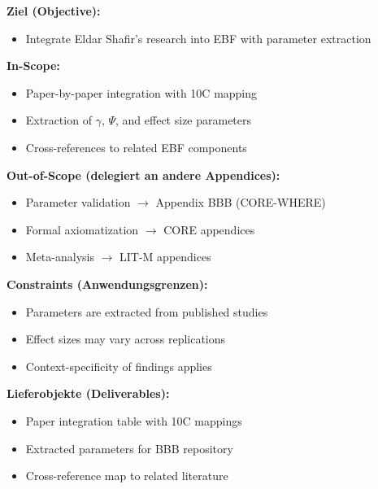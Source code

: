 
\begin{tcolorbox}[
    colback=orange!5!white,
    colframe=orange!75!black,
    title={\textbf{Appendix Scope: Ziel / In-Scope / Out-of-Scope / Constraints}},
    fonttitle=\bfseries
]

\textbf{Ziel (Objective):}
\begin{itemize}[nosep]
    \item Integrate Eldar Shafir's research into EBF with parameter extraction
\end{itemize}

\textbf{In-Scope:}
\begin{itemize}[nosep]
    \item Paper-by-paper integration with 10C mapping
    \item Extraction of $\gamma$, $\Psi$, and effect size parameters
    \item Cross-references to related EBF components
\end{itemize}

\textbf{Out-of-Scope (delegiert an andere Appendices):}
\begin{itemize}[nosep]
    \item Parameter validation $\rightarrow$ Appendix BBB (CORE-WHERE)
    \item Formal axiomatization $\rightarrow$ CORE appendices
    \item Meta-analysis $\rightarrow$ LIT-M appendices
\end{itemize}

\textbf{Constraints (Anwendungsgrenzen):}
\begin{itemize}[nosep]
    \item Parameters are extracted from published studies
    \item Effect sizes may vary across replications
    \item Context-specificity of findings applies
\end{itemize}

\textbf{Lieferobjekte (Deliverables):}
\begin{itemize}[nosep]
    \item Paper integration table with 10C mappings
    \item Extracted parameters for BBB repository
    \item Cross-reference map to related literature
\end{itemize}

\end{tcolorbox}

